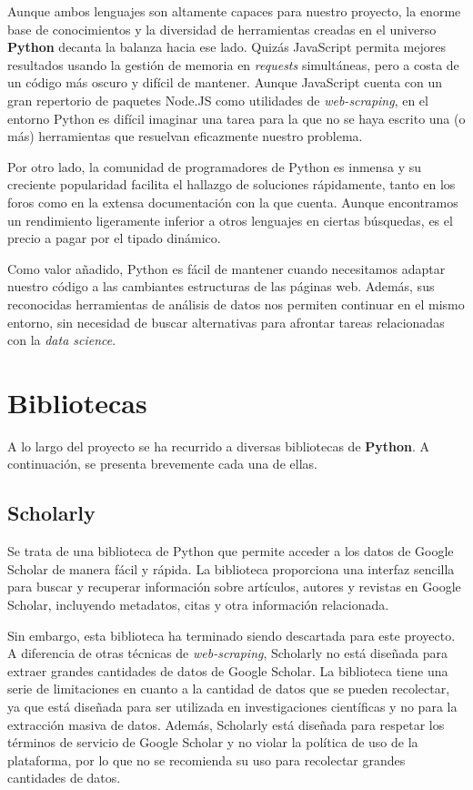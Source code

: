 Aunque ambos lenguajes son altamente capaces para nuestro proyecto, la enorme base de conocimientos y la diversidad de herramientas creadas en el universo \textbf{Python} decanta la balanza hacia ese lado. Quizás JavaScript permita mejores resultados usando la gestión de memoria en \textit{requests} simultáneas, pero a costa de un código más oscuro y difícil de mantener. Aunque JavaScript cuenta con un gran repertorio de paquetes Node.JS como utilidades de \textit{web-scraping}, en el entorno Python es difícil imaginar una tarea para la que no se haya escrito una (o más) herramientas que resuelvan eficazmente nuestro problema. 

Por otro lado, la comunidad de programadores de Python es inmensa y su creciente popularidad facilita el hallazgo de soluciones rápidamente, tanto en los foros como en la extensa documentación con la que cuenta. Aunque encontramos un rendimiento ligeramente inferior a otros lenguajes en ciertas búsquedas, es el precio a pagar por el tipado dinámico. 

Como valor añadido, Python es fácil de mantener cuando necesitamos adaptar nuestro código a las cambiantes estructuras de las páginas web. Además, sus reconocidas herramientas de análisis de datos nos permiten continuar en el mismo entorno, sin necesidad de buscar alternativas para afrontar tareas relacionadas con la \textit{data science}.

\section{Bibliotecas}
A lo largo del proyecto se ha recurrido a diversas bibliotecas de \textbf{Python}. A continuación, se presenta brevemente cada una de ellas.

\subsection{Scholarly}
Se trata de una biblioteca de Python que permite acceder a los datos de Google Scholar de manera fácil y rápida. La biblioteca proporciona una interfaz sencilla para buscar y recuperar información sobre artículos, autores y revistas en Google Scholar, incluyendo metadatos, citas y otra información relacionada.

Sin embargo, esta biblioteca ha terminado siendo descartada para este proyecto. A diferencia de otras técnicas de \textit{web-scraping}, Scholarly no está diseñada para extraer grandes cantidades de datos de Google Scholar. La biblioteca tiene una serie de limitaciones en cuanto a la cantidad de datos que se pueden recolectar, ya que está diseñada para ser utilizada en investigaciones científicas y no para la extracción masiva de datos. Además, Scholarly está diseñada para respetar los términos de servicio de Google Scholar y no violar la política de uso de la plataforma, por lo que no se recomienda su uso para recolectar grandes cantidades de datos.

